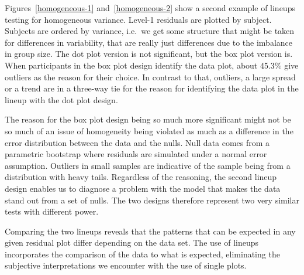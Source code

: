 \documentclass[12pt]{article} %
\newcommand{\hh}[1]{{\color{orange} #1}}
\begin{document}
\hh{Figures~\ref{homogeneous-1} and~\ref{homogeneous-2} show a second example of lineups testing for homogeneous variance.
Level-1 residuals are plotted by subject. Subjects are ordered by variance, i.e.~we get some structure that might be taken for differences in variability, that are really just differences due to the imbalance in group size. The dot plot version is not significant, but the box plot version is. When participants in the box plot design identify the data plot, about 45.3\% give outliers as the reason for their choice. In contrast to that, outliers, a large spread or a trend are in a three-way tie for the reason for identifying the data plot in the lineup with the dot plot design.

The reason for the box plot design being so much more significant might not be so much of an issue of homogeneity being violated as much as a difference in the error distribution between the data and the nulls. Null data comes from a parametric bootstrap where residuals are simulated under a normal error assumption. Outliers in small samples are indicative of the sample being from a distribution with heavy tails.
Regardless of the reasoning, the second lineup design enables us to diagnose a problem with the model that makes the data stand out from a set of nulls.  The two designs therefore represent two very similar tests with different power.}




Comparing the two lineups reveals that the patterns that can be expected in any given residual plot differ depending on the data set. The use of lineups incorporates the comparison of the data to what is expected, eliminating the subjective interpretations we encounter with the use of single plots. 



\end{document}
